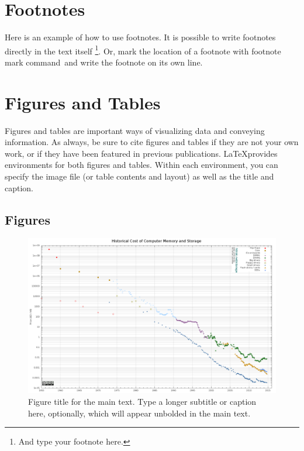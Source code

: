 \section{Footnotes}

Here is an example of how to use footnotes. It is possible to write footnotes directly in the text itself \footnote{And type your footnote here.}. Or, mark the location of a footnote with footnote mark command\footnotemark \, and write the footnote on its own line. 


\section{Figures and Tables}

Figures and tables are important ways of visualizing data and conveying information. As always, be sure to cite figures and tables if they are not your own work, or if they have been featured in previous publications. \LaTeX provides environments for both figures and tables. Within each environment, you can specify the image file (or table contents and layout) as well as the title and caption. 

\subsection{Figures}

\begin{figure}
	\includegraphics[width=\textwidth]{figures/exampleFigure.png} %
	\caption[Figure title for the Table of Contents]{ 
    Figure title for the main text. %
    \textmd{Type a longer subtitle or caption here, optionally, which will appear unbolded in the main text.}
    }
	\label{fig:figurelabel} %
\end{figure}

